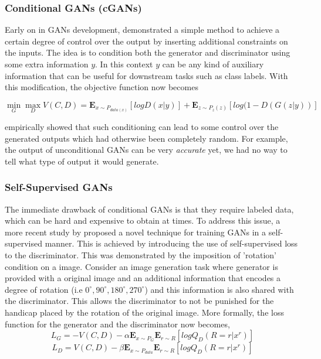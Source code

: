 \documentclass[11pt, letterpaper, oneside]{article}
\begin{document}
\subsubsection{Conditional GANs (cGANs)}
Early on in GANs development, \cite{mirza_conditional_nodate} demonstrated a simple method to achieve a certain degree of control over the output by inserting additional constraints on the inputs. The idea is to condition both the generator and discriminator using some extra information $y$. In this context $y$ can be any kind of auxiliary information that can be useful for downstream tasks such as class labels. With this modification, the objective function now becomes

\begin{equation} 
 \min_{G} \max_{D} V(C, D) = \mathbf{E}_{x \sim P_{data(x)}}[log D(x|y)] + \mathbf{E}_{z \sim P_z(z)}[log (1-D(G(z|y))]
\end{equation}

\cite{mirza_conditional_nodate} empirically showed that such conditioning can lead to some control over the generated outputs which had otherwise been completely random. For example, the output of unconditional GANs can be very \textit{accurate} yet, we had no way to tell what type of output it would generate.   

\subsubsection{Self-Supervised GANs}
The immediate drawback of conditional GANs is that they require labeled data, which can be hard and expensive to obtain at times. To address this issue, a more recent study by \cite{chen_self-supervised_2019} proposed a novel technique for training GANs in a self-supervised manner. This is achieved by introducing the use of self-supervised loss to the discriminator. This was demonstrated by the imposition of 'rotation' condition on a image. Consider an image generation task where generator is provided with a original image and an additional information that encodes a degree of rotation (i.e $0^{\circ}, 90^{\circ}, 180^{\circ}, 270^{\circ}$) and this information is also shared with the discriminator. This allows the discriminator to not be punished for the handicap placed by the rotation of the original image. More formally, the loss function for the generator and the discriminator now becomes,
\begin{equation}
L_G = -V(C, D) -\alpha \mathbf{E}_{x \sim P_G } \mathbf{E}_{r \sim R}[log Q_D(R = r|x^r)]
\end{equation}
\begin{equation}
L_D = V(C, D) -\beta \mathbf{E}_{x \sim P_{data} } \mathbf{E}_{r \sim R}[log Q_D(R = r|x^r)]
\end{equation}
\end{document}

